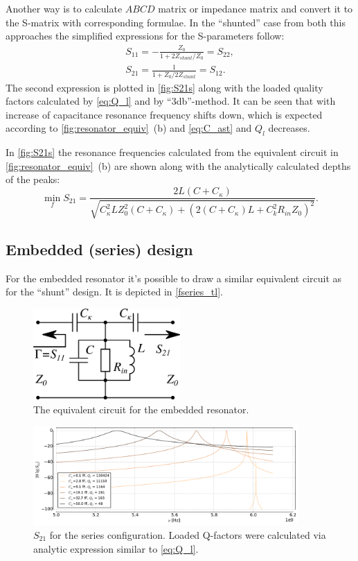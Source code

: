 \documentclass[12pt]{report}
\numberwithin{equation}{section}
\begin{document}
Another way is to calculate $ABCD$ matrix or impedance matrix and convert it to the S-matrix with corresponding formulae\cite{pozar2012}. In the ``shunted'' case from both this approaches the simplified expressions for the S-parameters follow:
\begin{gather}
S_{11} = -\frac{Z_0}{1 + 2Z_{shunt}/Z_0} = S_{22}, \\
S_{21} = \frac{1}{1+Z_0/2Z_{shunt}} = S_{12}. \label{eq:S21}
\end{gather}
The second expression is plotted in \autoref{fig:S21s} along with the loaded quality factors calculated by \eqref{eq:Q_l} and by ``3db''-method. It can be seen that with increase of capacitance resonance frequency shifts down, which is expected according to \autoref{fig:resonator_equiv}~(b) and \eqref{eq:C_ast} and $Q_l$ decreases.

In \autoref{fig:S21s} the resonance frequencies calculated from the equivalent circuit in \autoref{fig:resonator_equiv}~(b) are shown along with the analytically calculated depths of the peaks:
\begin{equation}
\min_f S_{21} = \frac{2 L \left(C + C_{\kappa}\right)}{\sqrt{C_{\kappa}^{2} L Z_{0}^{2} \left(C + C_{\kappa}\right) + \left(2 (C+C_\kappa) L + C_{k}^{2} R_{in} Z_{0} \right)^{2}}}.
\end{equation}

\subsection{Embedded (series) design}

For the embedded resonator it's possible to draw a similar equivalent circuit as for the ``shunt'' design\cite{Goppl2008}. It is depicted in \autoref{fseries_tl}. 

\begin{figure}[h]
\centering
\includegraphics[width=0.5\textwidth]{tl_scheme_series}
\caption{The equivalent circuit for the embedded resonator.}
\label{fseries_tl}
\end{figure}
\begin{figure}[h]
\centering
\includegraphics[width=0.9\textwidth]{S21s_series}
\caption{$S_{21}$ for the series configuration. Loaded Q-factors were calculated  via analytic expression similar to \eqref{eq:Q_l}.}
\label{fS21s_series}
\end{figure}
\end{document}
